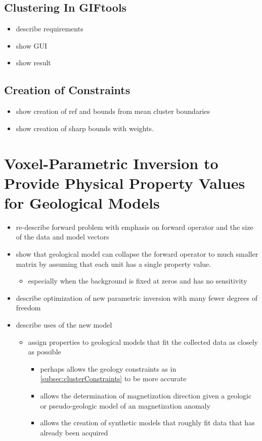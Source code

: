 \subsection{Clustering In GIFtools}
\label{subsec:clusterTools}

\begin{itemize}
 \item describe requirements
 \item show GUI
 \item show result
\end{itemize}

\subsection{Creation of Constraints}
\label{subsec:clusterConstraints}

\begin{itemize}
 \item show creation of ref and bounds from mean cluster boundaries
 \item show creation of sharp bounds with weights.
\end{itemize}

\section{Voxel-Parametric Inversion to Provide Physical Property Values for Geological Models}
\label{sec:voxelParam}


\begin{itemize}
 \item re-describe forward problem with emphasis on forward operator and the size of the data and model vectors
 \item show that geological model can collapse the forward operator to much smaller matrix by assuming that each unit has a single property value.
 \begin{itemize}
  \item especially when the background is fixed at zeros and has no sensitivity
 \end{itemize}
 \item describe optimization of new parametric inversion with many fewer degrees of freedom
 \item describe uses of the new model
 \begin{itemize}
  \item assign properties to geological models that fit the collected data as closely as possible
  \begin{itemize}
   \item perhaps allows the geology constraints as in \autoref{subsec:clusterConstraints} to be more accurate
   \item allows the determination of magnetization direction given a geologic or pseudo-geologic model of an magnetization anomaly   
   \item allows the creation of synthetic models that roughly fit data that has already been acquired
  \end{itemize}
 \end{itemize}
\end{itemize}



